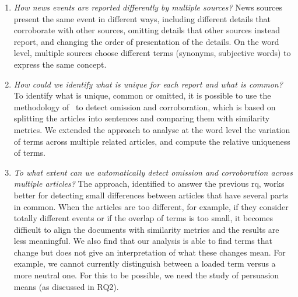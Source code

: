 \begin{enumerate}[label={\textbf{RQ1.\arabic*:}},leftmargin=2cm]
    \item \emph{How news events are reported differently by multiple sources?} News sources present the same event in different ways, including different details that corroborate with other sources, omitting details that other sources instead report, and changing the order of presentation of the details.
          On the word level, multiple sources choose different terms (synonyms, subjective words) to express the same concept. %
    \item \emph{How could we identify what is unique for each report and what is common?} To identify what is unique, common or omitted, it is possible to use the methodology of~\citet{bountouridis2018explaining} to detect omission and corroboration, %
          which is based on splitting the articles into sentences and comparing them with similarity metrics. We extended the approach to analyse at the word level the variation of terms across multiple related articles, and compute the relative uniqueness of terms.%
    \item \emph{To what extent can we automatically detect omission and corroboration across multiple articles?} The approach, identified to answer the previous \acrshort{rq}, works better for detecting small differences between articles that have several parts in common. When the articles are too different, for example, if they consider totally different events or if the overlap of terms is too small, it becomes difficult to align the documents with similarity metrics and the results are less meaningful. We also find that our analysis is able to find terms that change but does not give an interpretation of what these changes mean. For example, we cannot currently distinguish between a loaded term versus a more neutral one. For this to be possible, we need the study of persuasion means (as discussed in RQ2).

\end{enumerate}
